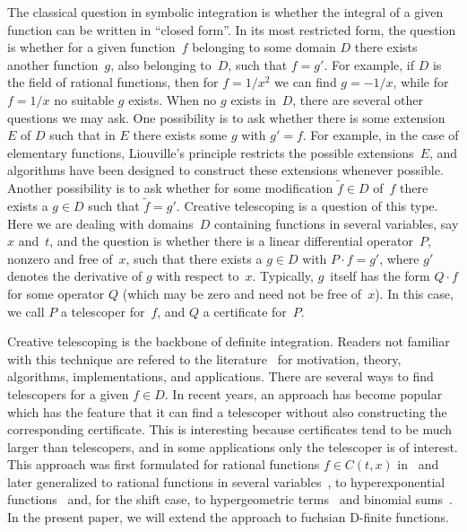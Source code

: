 \documentclass{sig-alternate}
\begin{document}
The classical question in symbolic integration is whether the integral of
a given function can be written in ``closed form''. In its most restricted form,
the question is whether for a given function~$f$ belonging to some domain $D$
there exists another function~$g$, also belonging to~$D$, such that $f=g'$. For
example, if $D$ is the field of rational functions, then for $f=1/x^2$ we can
find $g=-1/x$, while for $f=1/x$ no suitable $g$ exists. When no $g$ exists
in~$D$, there are several other questions we may ask. One possibility is to ask
whether there is some extension~$E$ of $D$ such that in $E$ there exists some
$g$ with $g'=f$. For example, in the case of elementary functions, Liouville's
principle restricts the possible extensions~$E$, and algorithms have been
designed to construct these extensions whenever possible. Another possibility is
to ask whether for some modification $\tilde f\in D$ of~$f$ there exists a $g\in
D$ such that $\tilde f=g'$. Creative telescoping is a question of this
type. Here we are dealing with domains~$D$ containing functions in several
variables, say $x$ and~$t$, and the question is whether there is a linear
differential operator~$P$, nonzero and free of~$x$, such that there exists a
$g\in D$ with $P\cdot f=g'$, where $g'$ denotes the derivative of $g$ with
respect to~$x$. Typically, $g$~itself has the form $Q\cdot f$ for some operator
$Q$ (which may be zero and need not be free of~$x$). In this case, we call $P$
a telescoper for~$f$, and $Q$ a certificate for~$P$.

Creative telescoping is the backbone of definite integration. Readers not
familiar with this technique are refered to the literature~\cite{PWZbook1996,Zeilberger1990c,Zeilberger1991,Zeilberger1990,Koepf1998}
for motivation, theory, algorithms, implementations, and applications. There are
several ways to find telescopers for a given $f\in D$. In recent years, an
approach has become popular which has the feature that it can find a telescoper
without also constructing the corresponding certificate. This is interesting
because certificates tend to be much larger than telescopers, and in some
applications only the telescoper is of interest. This approach was first
formulated for rational functions $f\in C(t,x)$ in~\cite{BCCL2010} and later
generalized to rational functions in several variables~\cite{bostan13}, to
hyperexponential functions~\cite{bostan13a} and, for the shift case, to hypergeometric
terms~\cite{chen15a} and binomial sums~\cite{bostan15}. In the present paper, we will extend
the approach to fuchsian D-finite functions.
\end{document}
